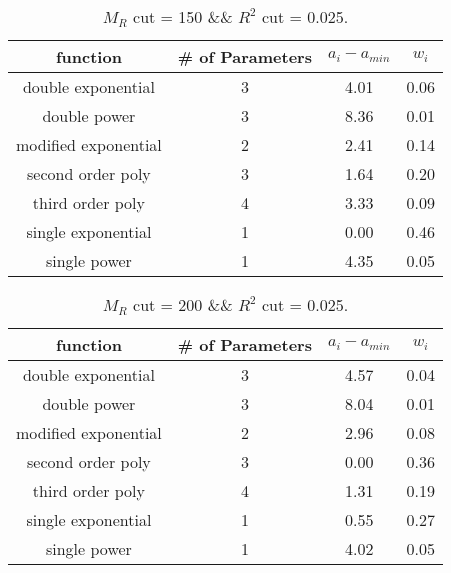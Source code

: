  
\begin{table}[H] 
\begin{center} 
\begin{tabular}{|c|c|c|c|} 
\hline function & \# of Parameters & $a_i-a_{min}$ & $w_i$ \\ \hline 
double exponential &  3 &   4.01 &   0.06 \\ 
double power &  3 &   8.36 &   0.01 \\ 
modified exponential &  2 &   2.41 &   0.14 \\ 
second order poly &  3 &   1.64 &   0.20 \\ 
third order poly &  4 &   3.33 &   0.09 \\ 
single exponential &  1 &   0.00 &   0.46 \\ 
single power &  1 &   4.35 &   0.05 \\ 
\hline 
\end{tabular} 
\caption{$M_R$ cut = 150 \&\& $R^2$ cut = 0.025.} 
\label{tab:FitChoices_150_0.025} 
\end{center} 
\end{table} 
 
 
\begin{table}[H] 
\begin{center} 
\begin{tabular}{|c|c|c|c|} 
\hline function & \# of Parameters & $a_i-a_{min}$ & $w_i$ \\ \hline 
double exponential &  3 &   4.57 &   0.04 \\ 
double power &  3 &   8.04 &   0.01 \\ 
modified exponential &  2 &   2.96 &   0.08 \\ 
second order poly &  3 &   0.00 &   0.36 \\ 
third order poly &  4 &   1.31 &   0.19 \\ 
single exponential &  1 &   0.55 &   0.27 \\ 
single power &  1 &   4.02 &   0.05 \\ 
\hline 
\end{tabular} 
\caption{$M_R$ cut = 200 \&\& $R^2$ cut = 0.025.} 
\label{tab:FitChoices_200_0.025} 
\end{center} 
\end{table} 
 
